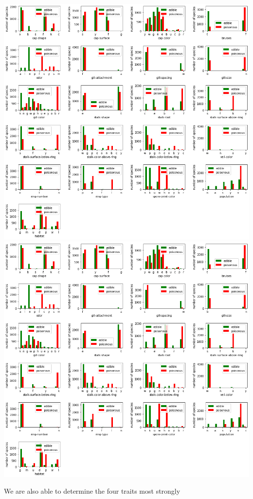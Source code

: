 \documentclass[11pt]{article}
\begin{document}
\begin{center}
\includegraphics[scale=0.8,trim=680 575 0 145,clip=true]{histograms.png}
\includegraphics[scale=0.8,trim=680 430 0 280,clip=true]{histograms.png}
\end{center}
We are also able to determine the four traits most strongly
\end{document}
